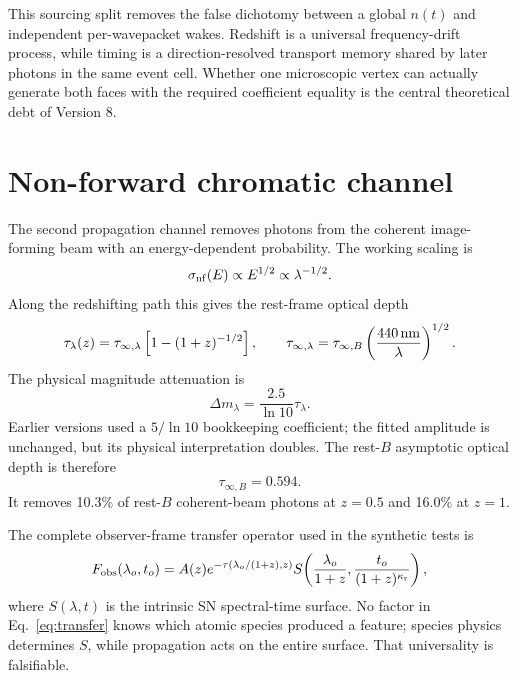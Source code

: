 \documentclass[11pt]{article}
\newcommand{\tauinf}{\tau_{\infty,B}}
\newcommand{\kreact}{\kappa_{\rm r}}
\begin{document}
This sourcing split removes the false dichotomy between a global $n(t)$ and independent per-wavepacket wakes. Redshift is a universal frequency-drift process, while timing is a direction-resolved transport memory shared by later photons in the same event cell. Whether one microscopic vertex can actually generate both faces with the required coefficient equality is the central theoretical debt of Version 8.

\section{Non-forward chromatic channel}
The second propagation channel removes photons from the coherent image-forming beam with an energy-dependent probability. The working scaling is
\begin{equation}
 \sigma_{\rm nf}(E)\propto E^{1/2}\propto\lambda^{-1/2}.
 \label{eq:sigma}
\end{equation}
Along the redshifting path this gives the rest-frame optical depth
\begin{equation}
 \tau_\lambda(z)=\tau_{\infty,\lambda}
 \left[1-(1+z)^{-1/2}\right],
 \qquad
 \tau_{\infty,\lambda}=\tauinf\left(\frac{440\,{\rm nm}}{\lambda}\right)^{1/2}.
 \label{eq:tau}
\end{equation}
The physical magnitude attenuation is
\begin{equation}
 \Delta m_\lambda=\frac{2.5}{\ln 10}\tau_\lambda.
 \label{eq:magop}
\end{equation}
Earlier versions used a $5/\ln10$ bookkeeping coefficient; the fitted amplitude is unchanged, but its physical interpretation doubles. The rest-$B$ asymptotic optical depth is therefore
\begin{equation}
 \boxed{\tauinf=0.594}.
\end{equation}
It removes 10.3\% of rest-$B$ coherent-beam photons at $z=0.5$ and 16.0\% at $z=1$.

The complete observer-frame transfer operator used in the synthetic tests is
\begin{equation}
 F_{\rm obs}(\lambda_o,t_o)=A(z)
 e^{-\tau(\lambda_o/(1+z),z)}
 S\!\left(\frac{\lambda_o}{1+z},\frac{t_o}{(1+z)^{\kreact}}\right),
 \label{eq:transfer}
\end{equation}
where $S(\lambda,t)$ is the intrinsic SN spectral-time surface. No factor in Eq.~\eqref{eq:transfer} knows which atomic species produced a feature; species physics determines $S$, while propagation acts on the entire surface. That universality is falsifiable.
\end{document}
